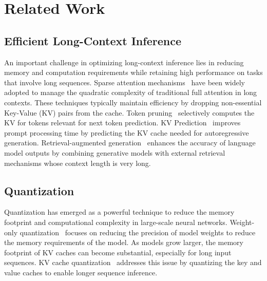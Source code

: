\section{Related Work}

\subsection{Efficient Long-Context Inference}
An important challenge in optimizing long-context inference lies in reducing memory and computation requirements while retaining high performance on tasks that involve long sequences.
Sparse attention mechanisms~\citep{liu2021sparseattn,xiao2023streamllm,yao2024sirllm,tang2024quest,yang2024doublesparse,liu2024scissorhands,ge2023model,jiang2024minference} have been widely adopted to manage the quadratic complexity of traditional full attention in long contexts. 
These techniques typically maintain efficiency by dropping non-essential Key-Value (KV) pairs from the cache.
Token pruning~\citep{fu2024lazyllm} selectively computes the KV for tokens relevant for next token prediction. KV Prediction~\citep{horton2024kvpredictionimprovedtime} improves prompt processing time by predicting the KV cache needed for autoregressive generation. 
Retrieval-augmented generation~\citep{tan2024lloco,liu2024retrievalattention} enhances the accuracy of language model outputs by combining generative models with external retrieval mechanisms whose context length is very long.


\subsection{Quantization}
Quantization has emerged as a powerful technique to reduce the memory footprint and computational complexity in large-scale neural networks.
Weight-only quantization~\cite{lin2024awq,kim2023squeezellm,shao2023omniquant,chee2024quip} focuses on reducing the precision of model weights to reduce the memory requirements of the model.
As models grow larger, the memory footprint of KV caches can become substantial, especially for long input sequences. KV cache quantization~\cite{liu2024kivi,hooper2024kvquant,kang2024gear} addresses this issue by quantizing the key and value caches to enable longer sequence inference.

